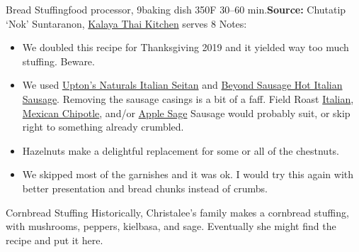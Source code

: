 \begin{recipe}{Bread Stuffing}{food processor, 9\inch{}\inch baking dish \hfill 350\0F \hfill 30--60 min.}{\textbf{Source:} Chutatip `Nok' Suntaranon, \href{https://www.kalaya.net/}{Kalaya Thai Kitchen} \hfill serves 8}
 \freeform Notes:
 \begin{itemize}
  \item We doubled this recipe for Thanksgiving 2019 and it yielded way too much stuffing. Beware.
  \item We used \href{https://www.uptonsnaturals.com/products/italian-seitan}{Upton's Naturals Italian Seitan} and \href{https://www.beyondmeat.com/products/hot-italian/}{Beyond Sausage Hot Italian Sausage}. Removing the sausage casings is a bit of a faff. Field Roast \href{https://fieldroast.com/product/italian-sausage/}{Italian}, \href{https://fieldroast.com/product/mexican-chipotle-sausage/}{Mexican Chipotle}, and/or \href{https://fieldroast.com/product/smoked-apple-sage-sausage/}{Apple Sage} Sausage would probably suit, or skip right to something already crumbled.
  \item Hazelnuts make a delightful replacement for some or all of the chestnuts.
  \item We skipped most of the garnishes and it was ok. I would try this again with better presentation and bread chunks instead of crumbs.
 \end{itemize}
\end{recipe}

\begin{recipe}{Cornbread Stuffing}{}{}
 \freeform Historically, Christalee's family makes a cornbread stuffing, with mushrooms, peppers, kielbasa, and sage. Eventually she might find the recipe and put it here.
\end{recipe}
